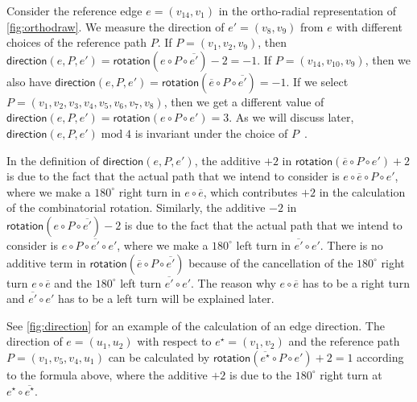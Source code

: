 \documentclass{article}\usepackage[a4paper,margin=20mm]{geometry}
\newcommand{\rotation}{\mathsf{rotation}}
\newcommand{\direction}{\mathsf{direction}}
\newcommand{\eref}{e^\star}
\renewcommand{\mod}{\operatorname{mod}}
\begin{document}
Consider the reference edge $e = (v_{14},v_1)$ in the ortho-radial representation of \cref{fig:orthodraw}. We measure the direction of $e' = (v_8, v_9)$ from $e$ with different choices of the reference path $P$. If $P = (v_1, v_2, v_9)$, then $\direction(e, P, e')= \rotation(e \circ P \circ \overline{e'})-2 = -1$. If  $P = (v_{14}, v_{10}, v_9)$, then we also have $\direction(e, P, e')= \rotation(\overline{e} \circ P \circ \overline{e'}) = -1$. If we select $P=(v_1, v_2, v_3, v_4, v_5, v_6, v_7, v_8)$, then we get a different value of $\direction(e, P, e')= \rotation({e} \circ P \circ {e'}) = 3$. As we will discuss later, $\direction(e, P, e') \mod 4$ is invariant under the choice of $P$~\cite{barth2023topology}. 

In the definition of  $\direction(e, P, e')$, the additive $+2$ in $\rotation(\overline{e} \circ P \circ e')+2$ is due to the fact that the actual path that we intend to consider is $e \circ \overline{e} \circ P \circ e'$, where we make a $180^\circ$ right turn in $e \circ \overline{e}$, which contributes $+2$ in the calculation of the combinatorial rotation. Similarly, the additive $-2$ in $\rotation(e \circ P \circ \overline{e'})-2$ is due to the fact that the actual path that we intend to consider is $e \circ P \circ \overline{e'} \circ e'$, where we make a $180^\circ$ left turn in $\overline{e'} \circ e'$. There is no additive term in $\rotation(\overline{e} \circ P \circ \overline{e'})$  because of the cancellation of the $180^\circ$ right turn $e \circ \overline{e}$ and the $180^\circ$ left turn $\overline{e'} \circ e'$. The reason why $e \circ \overline{e}$ has to be a right turn and $\overline{e'} \circ e'$ has to be a left turn will be explained later.

See \cref{fig:direction} for an example of the calculation of an edge direction. The direction of $e = (u_1, u_2)$ with respect to $\eref= (v_1,v_2)$  and the reference path  $P=(v_1, v_5, v_4, u_1)$ can be calculated by 
$\rotation(\overline{\eref} \circ P \circ e')+2=1$ according to the formula above, where the additive $+2$ is due to the $180^\circ$ right turn at $\eref \circ \overline{\eref}$.
\end{document}
